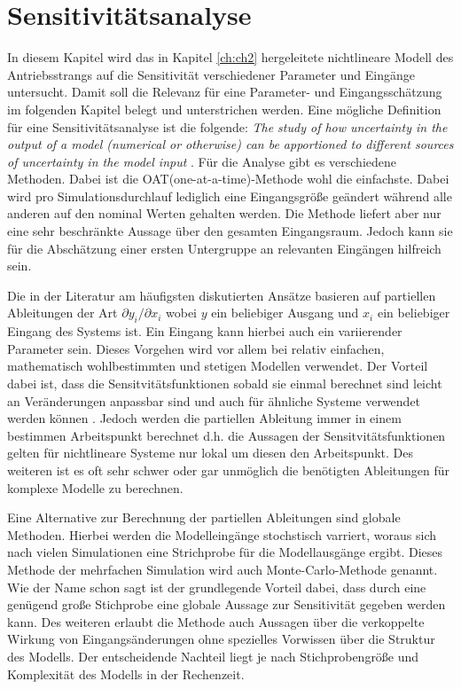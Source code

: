 \chapter{Sensitivitätsanalyse}\label{ch:Sensitivity}
In diesem Kapitel wird das in Kapitel \ref{ch:ch2} hergeleitete nichtlineare Modell des Antriebsstrangs auf die Sensitivität verschiedener Parameter und Eingänge untersucht. Damit soll die Relevanz für eine Parameter- und Eingangsschätzung im folgenden Kapitel belegt und unterstrichen werden.
Eine mögliche Definition für eine Sensitivitätsanalyse ist die folgende: \emph{The study of how uncertainty in the output of a model (numerical or otherwise) can be apportioned to different sources of uncertainty in the model input} \cite{Saltelli.2004}.
Für die Analyse gibt es verschiedene Methoden. Dabei ist die OAT(one-at-a-time)-Methode wohl die einfachste. Dabei wird pro Simulationsdurchlauf lediglich eine Eingangsgröße geändert während alle anderen auf den nominal Werten gehalten werden. Die Methode liefert aber nur eine sehr beschränkte Aussage über den gesamten Eingangsraum. Jedoch kann sie für die Abschätzung einer ersten Untergruppe an relevanten Eingängen hilfreich sein.    

 Die in der Literatur am häufigsten diskutierten Ansätze basieren auf partiellen Ableitungen der Art $\partial y_i/\partial x_i$ wobei $y$ ein beliebiger Ausgang und $x_i$ ein beliebiger Eingang des Systems ist. Ein Eingang kann hierbei auch ein variierender Parameter sein. Dieses Vorgehen wird vor allem bei relativ einfachen, mathematisch wohlbestimmten und stetigen Modellen verwendet. Der Vorteil dabei ist, dass die Sensitvitätsfunktionen sobald sie einmal berechnet sind leicht an Veränderungen anpassbar sind und auch für ähnliche Systeme verwendet werden können \cite{Karnavas.1993}. Jedoch werden die partiellen Ableitung immer in einem bestimmen Arbeitspunkt berechnet d.h. die Aussagen der Sensitvitätsfunktionen gelten für nichtlineare Systeme nur lokal um diesen den Arbeitspunkt. Des weiteren ist es oft sehr schwer oder gar unmöglich die benötigten Ableitungen für komplexe Modelle zu berechnen.

Eine Alternative zur Berechnung der partiellen Ableitungen sind globale Methoden. Hierbei werden die Modelleingänge stochstisch varriert, woraus sich nach vielen Simulationen eine Strichprobe für die Modellausgänge ergibt. Dieses Methode der mehrfachen Simulation wird auch Monte-Carlo-Methode genannt. Wie der Name schon sagt ist der grundlegende Vorteil dabei, dass durch eine genügend große Stichprobe eine globale Aussage zur Sensitivität gegeben werden kann. Des weiteren erlaubt die Methode auch Aussagen über die verkoppelte Wirkung von Eingangsänderungen ohne spezielles Vorwissen über die Struktur des Modells. Der entscheidende Nachteil liegt je nach Stichprobengröße und Komplexität des Modells in der Rechenzeit.      

